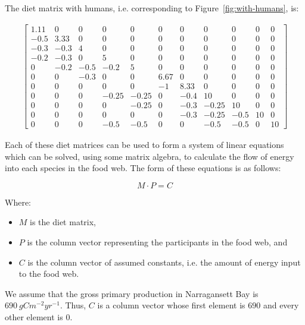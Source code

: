 \newpage

The diet matrix with humans, i.e. corresponding to Figure~\ref{fig:with-humans}, is:

\begin{gather*}
    \begin{bmatrix}
        1.11 & 0 & 0 & 0 & 0 & 0 & 0 & 0 & 0 & 0 & 0 \\
        -0.5 & 3.33 & 0 & 0 & 0 & 0 & 0 & 0 & 0 & 0 & 0 \\
        -0.3 & -0.3 & 4 & 0 & 0 & 0 & 0 & 0 & 0 & 0 & 0 \\
        -0.2 & -0.3 & 0 & 5 & 0 & 0 & 0 & 0 & 0 & 0 & 0 \\
        0 & -0.2 & -0.5 & -0.2 & 5 & 0 & 0 & 0 & 0 & 0 & 0 \\
        0 & 0 & -0.3 & 0 & 0 & 6.67 & 0 & 0 & 0 & 0 & 0 \\
        0 & 0 & 0 & 0 & 0 & -1 & 8.33 & 0 & 0 & 0 & 0 \\
        0 & 0 & 0 & -0.25 & -0.25 & 0 & -0.4 & 10 & 0 & 0 & 0 \\
        0 & 0 & 0 & 0 & -0.25 & 0 & -0.3 & -0.25 & 10 & 0 & 0 \\
        0 & 0 & 0 & 0 & 0 & 0 & -0.3 & -0.25 & -0.5 & 10 & 0 \\
        0 & 0 & 0 & -0.5 & -0.5 & 0 & 0 & -0.5 & -0.5 & 0 & 10
    \end{bmatrix}
\end{gather*}

\newpage

Each of these diet matrices can be used to form a system of linear equations which can be solved, using some matrix algebra, to calculate the flow of energy into each species in the food web.
The form of these equations is as follows:

\begin{equation*}
    M \cdot P = C
\end{equation*}

Where:
\begin{itemize}
    \item $M$ is the diet matrix,
    \item $P$ is the column vector representing the participants in the food web, and
    \item $C$ is the column vector of assumed constants, i.e. the amount of energy input to the food web.
\end{itemize}

We assume that the gross primary production in Narragansett Bay is $690 \ gCm^{-2}yr^{-1}$.
Thus, $C$ is a column vector whose first element is $690$ and every other element is $0$.
